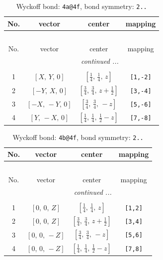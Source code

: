 \documentclass[fleqn,8pt]{jsarticle}
\begin{document}
\begin{longtable}{cccc}
\caption{Wyckoff bond: {\tt 4a@4f}, bond symmetry: {\tt 2..}}
 \\
 \hline \hline
No. & vector & center & mapping \\ \hline \endfirsthead

\multicolumn{3}{l}{\tablename\ \thetable{}} \\
 \hline \hline
No. & vector & center & mapping \\ \hline \endhead

 \hline \hline
\multicolumn{3}{r}{\footnotesize\it continued ...} \\ \endfoot

 \hline \hline
\multicolumn{3}{r}{} \\ \endlastfoot

1 & $\left[ X,\, Y,\, 0 \right]$ & $\left[ \frac{1}{4},\, \frac{1}{4},\, z \right]$ & {\tt [1,-2]} \\ \hline
2 & $\left[ - Y,\, X,\, 0 \right]$ & $\left[ \frac{3}{4},\, \frac{3}{4},\, z + \frac{1}{2} \right]$ & {\tt [3,-4]} \\ \hline
3 & $\left[ - X,\, - Y,\, 0 \right]$ & $\left[ \frac{3}{4},\, \frac{3}{4},\, - z \right]$ & {\tt [5,-6]} \\ \hline
4 & $\left[ Y,\, - X,\, 0 \right]$ & $\left[ \frac{1}{4},\, \frac{1}{4},\, \frac{1}{2} - z \right]$ & {\tt [7,-8]} \\
\end{longtable}
\renewcommand{\arraystretch}{1.2}
\begin{longtable}{cccc}
\caption{Wyckoff bond: {\tt 4b@4f}, bond symmetry: {\tt 2..}}
 \\
 \hline \hline
No. & vector & center & mapping \\ \hline \endfirsthead

\multicolumn{3}{l}{\tablename\ \thetable{}} \\
 \hline \hline
No. & vector & center & mapping \\ \hline \endhead

 \hline \hline
\multicolumn{3}{r}{\footnotesize\it continued ...} \\ \endfoot

 \hline \hline
\multicolumn{3}{r}{} \\ \endlastfoot

1 & $\left[ 0,\, 0,\, Z \right]$ & $\left[ \frac{1}{4},\, \frac{1}{4},\, z \right]$ & {\tt [1,2]} \\ \hline
2 & $\left[ 0,\, 0,\, Z \right]$ & $\left[ \frac{3}{4},\, \frac{3}{4},\, z + \frac{1}{2} \right]$ & {\tt [3,4]} \\ \hline
3 & $\left[ 0,\, 0,\, - Z \right]$ & $\left[ \frac{3}{4},\, \frac{3}{4},\, - z \right]$ & {\tt [5,6]} \\ \hline
4 & $\left[ 0,\, 0,\, - Z \right]$ & $\left[ \frac{1}{4},\, \frac{1}{4},\, \frac{1}{2} - z \right]$ & {\tt [7,8]} \\
\end{longtable}
\end{document}
